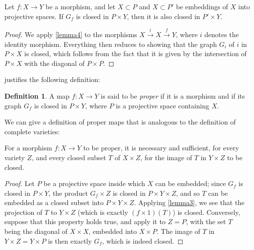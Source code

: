 \documentclass[10pt]{article}
\theoremstyle{plain}
\newenvironment{proposition}[1]
  {\renewcommand\theinnercustomproposition{#1}\innercustomproposition}
  {\endinnercustomproposition}
\newenvironment{lemma}[1]
  {\renewcommand\theinnercustomlemma{#1}\innercustomlemma}
  {\endinnercustomlemma}
\theoremstyle{definition}
\newtheorem*{definition}{Definition}
\newcommand{\oldpage}[1]{\marginpar{\textit{p.~#1}}}
\begin{document}
\begin{lemma}{5}
\label{lemma5}
  Let $f\colon X\to Y$ be a morphism, and let $X\subset P$ and $X\subset P'$ be embeddings of $X$ into projective spaces.
  If $G_f$ is closed in $P\times Y$, then it is also closed in $P'\times Y$.
\end{lemma}

\begin{proof}
  We apply \cref{lemma4} to the morphisms $X\xrightarrow{i}X\xrightarrow{f}Y$, where $i$ denotes the identity morphism.
  Everything then reduces to showing that the graph $G_i$ of $i$ in $P\times X$ is closed, which follows from the fact that it is given by the intersection of $P\times X$ with the diagonal of $P\times P$.
\end{proof}

 justifies the following definition:

\begin{definition}
  A map $f\colon X\to Y$ is said to be \emph{proper} if it is a morphism and if its graph $G_f$ is closed in $P\times Y$, where $P$ is a projective space containing $X$.
\end{definition}

We can give a definition of proper maps that is analogous to the definition of complete varieties:

\begin{proposition}{3}
\label{proposition3}
  For a morphism $f\colon X\to Y$ to be proper, it is necessary and sufficient, for every variety $Z$, and every closed subset $T$ of $X\times Z$, for the image of $T$ in $Y\times Z$ to be closed.
\end{proposition}

\begin{proof}
  Let $P$ be a projective space inside which $X$ can be embedded;
  since $G_f$ is closed in $P\times Y$, the product $G_f\times Z$ is closed in $P\times Y\times Z$, and so $T$ can be embedded as a closed subset into $P\times Y\times Z$.
\oldpage{101}
  Applying \cref{lemma3}, we see that the projection of $T$ to $Y\times Z$ (which is exactly $(f\times1)(T)$) is closed.
  Conversely, suppose that this property holds true, and apply it to $Z=P$, with the set $T$ being the diagonal of $X\times X$, embedded into $X\times P$.
  The image of $T$ in $Y\times Z=Y\times P$ is then exactly $G_f$, which is indeed closed.
\end{proof}
\end{document}

